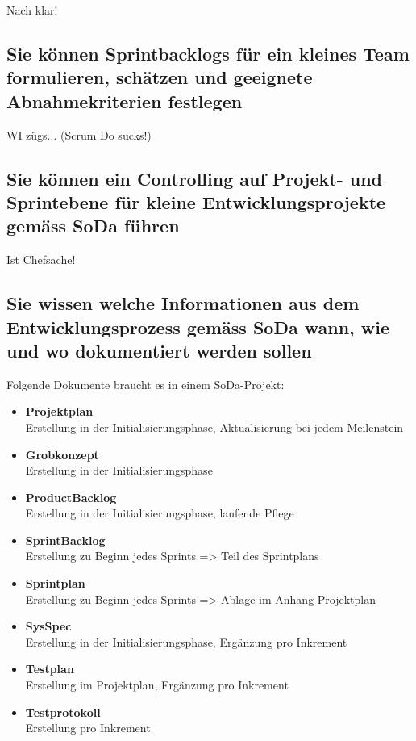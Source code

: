 Nach klar!

\subsection{Sie können Sprintbacklogs für ein kleines Team formulieren, schätzen und geeignete Abnahmekriterien festlegen}

WI zügs... (Scrum Do sucks!)

\subsection{Sie können ein Controlling auf Projekt- und Sprintebene für kleine Entwicklungsprojekte gemäss SoDa führen}

Ist Chefsache!

\subsection{Sie wissen welche Informationen aus dem Entwicklungsprozess gemäss SoDa wann, wie und wo dokumentiert werden sollen}

Folgende Dokumente braucht es in einem SoDa-Projekt:

\begin{itemize}
	\item \textbf{Projektplan} \\
		  Erstellung in der Initialisierungsphase, Aktualisierung bei jedem Meilenstein
	\item \textbf{Grobkonzept} \\ 
		  Erstellung in der Initialisierungsphase
	\item \textbf{ProductBacklog} \\
		  Erstellung in der Initialisierungsphase, laufende Pflege
	\item \textbf{SprintBacklog} \\
		  Erstellung zu Beginn jedes Sprints => Teil des Sprintplans
	\item \textbf{Sprintplan} \\
		  Erstellung zu Beginn jedes Sprints => Ablage im Anhang Projektplan
	\item \textbf{SysSpec} \\
		  Erstellung in der Initialisierungsphase, Ergänzung pro Inkrement
	\item \textbf{Testplan} \\
		  Erstellung im Projektplan, Ergänzung pro Inkrement
	\item \textbf{Testprotokoll} \\
		  Erstellung pro Inkrement
\end{itemize}
